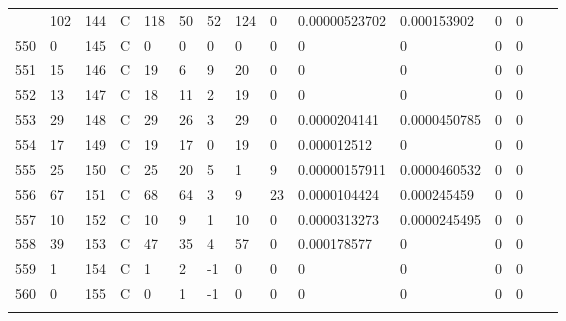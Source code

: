 \begin{longtable}{lllllllllllllll}
\begin{comment}
	549 & 102               & 144 & C   & 118               & 50                & 52                & 124  & 0          & 0.00000523702  & 0.000153902    & 0             & 0            \\
	550 & 0                 & 145 & C   & 0                 & 0                 & 0                 & 0    & 0          & 0              & 0              & 0             & 0            \\
	551 & 15                & 146 & C   & 19                & 6                 & 9                 & 20   & 0          & 0              & 0              & 0             & 0            \\
	552 & 13                & 147 & C   & 18                & 11                & 2                 & 19   & 0          & 0              & 0              & 0             & 0            \\
	553 & 29                & 148 & C   & 29                & 26                & 3                 & 29   & 0          & 0.0000204141   & 0.0000450785   & 0             & 0            \\
	554 & 17                & 149 & C   & 19                & 17                & 0                 & 19   & 0          & 0.000012512    & 0              & 0             & 0            \\
	555 & 25                & 150 & C   & 25                & 20                & 5                 & 1    & 9          & 0.00000157911  & 0.0000460532   & 0             & 0            \\
	556 & 67                & 151 & C   & 68                & 64                & 3                 & 9    & 23         & 0.0000104424   & 0.000245459    & 0             & 0            \\
	557 & 10                & 152 & C   & 10                & 9                 & 1                 & 10   & 0          & 0.0000313273   & 0.0000245495   & 0             & 0            \\
	558 & 39                & 153 & C   & 47                & 35                & 4                 & 57   & 0          & 0.000178577    & 0              & 0             & 0            \\
	559 & 1                 & 154 & C   & 1                 & 2                 & -1                & 0    & 0          & 0              & 0              & 0             & 0            \\
	560 & 0                 & 155 & C   & 0                 & 1                 & -1                & 0    & 0          & 0              & 0              & 0             & 0            \\

\end{comment}
\end{longtable}
